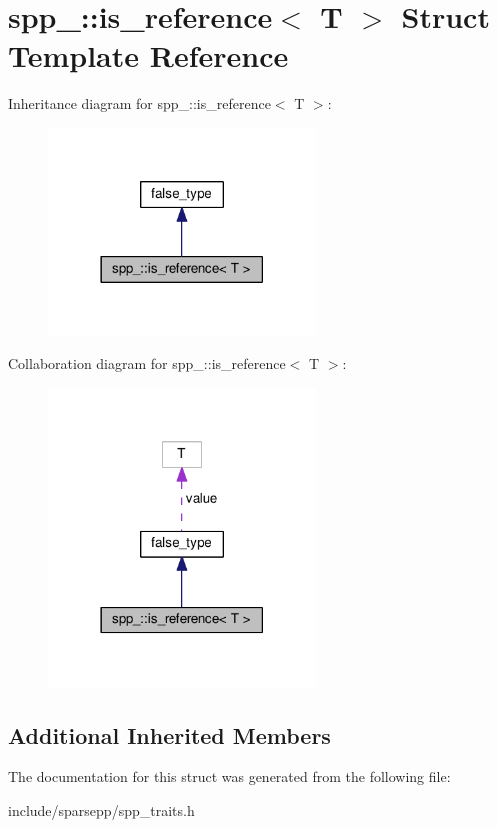 \hypertarget{structspp___1_1is__reference}{}\section{spp\+\_\+\+:\+:is\+\_\+reference$<$ T $>$ Struct Template Reference}
\label{structspp___1_1is__reference}


Inheritance diagram for spp\+\_\+\+:\+:is\+\_\+reference$<$ T $>$\+:\nopagebreak
\begin{figure}[H]
\begin{center}
\leavevmode
\includegraphics[width=201pt]{structspp___1_1is__reference__inherit__graph}
\end{center}
\end{figure}


Collaboration diagram for spp\+\_\+\+:\+:is\+\_\+reference$<$ T $>$\+:\nopagebreak
\begin{figure}[H]
\begin{center}
\leavevmode
\includegraphics[width=201pt]{structspp___1_1is__reference__coll__graph}
\end{center}
\end{figure}
\subsection*{Additional Inherited Members}


The documentation for this struct was generated from the following file\+:\begin{DoxyCompactItemize}
\item 
include/sparsepp/spp\+\_\+traits.\+h\end{DoxyCompactItemize}
